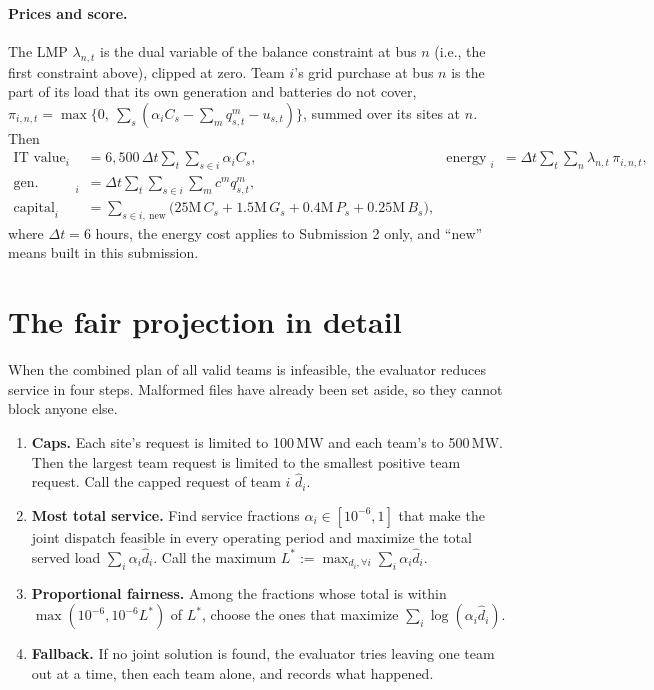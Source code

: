 \documentclass[10pt]{article}
\newcommand{\MW}{\ensuremath{\,\mathrm{MW}}}
\begin{document}
\paragraph{Prices and score.} The LMP $\lambda_{n,t}$ is the dual variable of
the balance constraint at bus $n$ (i.e., the first constraint above), clipped at zero. Team $i$'s grid purchase at
bus $n$ is the part of its load that its own generation and batteries do not
cover, $\pi_{i,n,t} = \max\{0,\ \sum_{s} (\alpha_i C_s - \sum_m q^m_{s,t} - u_{s,t})\}$,
summed over its sites at $n$. Then
\begin{align*}
  \text{IT value}_i &= 6{,}500\,\Delta t \sum_t \sum_{s \in i} \alpha_i C_s, &
  \text{energy cost}_i &= \Delta t \sum_t \sum_n \lambda_{n,t}\, \pi_{i,n,t},\\
  \text{gen.\ operating}_i &= \Delta t \sum_t \sum_{s \in i} \sum_m c^m q^m_{s,t},\\
  \text{capital}_i &= \sum_{s \in i,\ \text{new}} \big(25\text{M}\,C_s + 1.5\text{M}\,G_s + 0.4\text{M}\,P_s + 0.25\text{M}\,B_s\big),
\end{align*}
where $\Delta t = 6$ hours, the energy cost applies to Submission 2 only, and
``new'' means built in this submission.

\section{The fair projection in detail}\label{app:projection}

When the combined plan of all valid teams is infeasible, the evaluator reduces
service in four steps. Malformed files have already been set aside, so they
cannot block anyone else.
\begin{enumerate}[leftmargin=*]
  \item \textbf{Caps.} Each site's request is limited to 100\MW{} and each
    team's to 500\MW{}. Then the largest team request is limited to the
    smallest positive team request. Call the capped request of team $i$
    $\hat d_i$.
  \item \textbf{Most total service.} Find service fractions
    $\alpha_i \in [10^{-6}, 1]$ that make the joint dispatch feasible in every
    operating period and maximize the total served load $\sum_i \alpha_i \hat d_i$. Call the
    maximum $L^* := \max_{d_i, \forall i} \sum_i \alpha_i \hat d_i$.
  \item \textbf{Proportional fairness.} Among the fractions whose total is
    within $\max(10^{-6}, 10^{-6}L^*)$ of $L^*$, choose the ones that maximize
    $\sum_i \log(\alpha_i \hat d_i)$.
  \item \textbf{Fallback.} If no joint solution is found, the evaluator tries
    leaving one team out at a time, then each team alone, and records what
    happened.
\end{enumerate}
\end{document}
